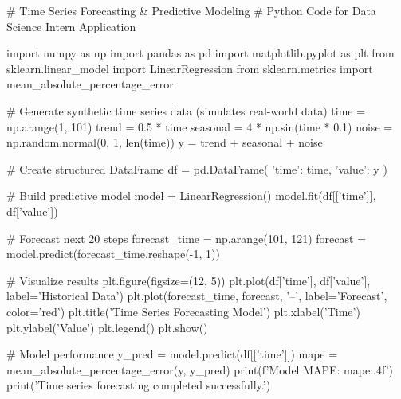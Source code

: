# Time Series Forecasting & Predictive Modeling
# Python Code for Data Science Intern Application

import numpy as np
import pandas as pd
import matplotlib.pyplot as plt
from sklearn.linear_model import LinearRegression
from sklearn.metrics import mean_absolute_percentage_error

# Generate synthetic time series data (simulates real-world data)
time = np.arange(1, 101)
trend = 0.5 * time
seasonal = 4 * np.sin(time * 0.1)
noise = np.random.normal(0, 1, len(time))
y = trend + seasonal + noise

# Create structured DataFrame
df = pd.DataFrame({
    'time': time,
    'value': y
})

# Build predictive model
model = LinearRegression()
model.fit(df[['time']], df['value'])

# Forecast next 20 steps
forecast_time = np.arange(101, 121)
forecast = model.predict(forecast_time.reshape(-1, 1))

# Visualize results
plt.figure(figsize=(12, 5))
plt.plot(df['time'], df['value'], label='Historical Data')
plt.plot(forecast_time, forecast, '--', label='Forecast', color='red')
plt.title('Time Series Forecasting Model')
plt.xlabel('Time')
plt.ylabel('Value')
plt.legend()
plt.show()

# Model performance
y_pred = model.predict(df[['time']])
mape = mean_absolute_percentage_error(y, y_pred)
print(f'Model MAPE: {mape:.4f}')
print('Time series forecasting completed successfully.')